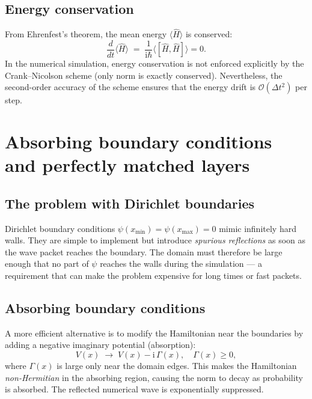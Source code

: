 \documentclass[12pt, a4paper]{article}
\newcommand{\dt}{\Delta t}
\newcommand{\ii}{\mathrm{i}}          %
\newcommand{\CN}{Crank--Nicolson}
\begin{document}
\subsection{Energy conservation}

From Ehrenfest's theorem, the mean energy $\langle\hat{H}\rangle$ is
conserved:
\begin{equation}
  \frac{d}{dt}\langle\hat{H}\rangle \;=\;
  \frac{1}{\ii\hbar}\langle[\hat{H},\hat{H}]\rangle = 0.
\end{equation}
In the numerical simulation, energy conservation is not enforced
explicitly by the \CN{} scheme (only norm is exactly conserved).
Nevertheless, the second-order accuracy of the scheme ensures that
the energy drift is $\mathcal{O}(\dt^2)$ per step.

\section{Absorbing boundary conditions and perfectly matched layers}
\label{app:abc}

\subsection{The problem with Dirichlet boundaries}

Dirichlet boundary conditions $\psi(x_\text{min}) = \psi(x_\text{max}) = 0$
mimic infinitely hard walls.  They are simple to implement but introduce
\emph{spurious reflections} as soon as the wave packet reaches the boundary.
The domain must therefore be large enough that no part of $\psi$ reaches
the walls during the simulation — a requirement that can make the problem
expensive for long times or fast packets.

\subsection{Absorbing boundary conditions}

A more efficient alternative is to modify the Hamiltonian near the
boundaries by adding a negative imaginary potential (absorption):
\begin{equation}
  V(x) \;\to\; V(x) - \ii\,\Gamma(x),
  \quad \Gamma(x) \geq 0,
\end{equation}
where $\Gamma(x)$ is large only near the domain edges.  This makes
the Hamiltonian \emph{non-Hermitian} in the absorbing region, causing
the norm to decay as probability is absorbed.  The reflected numerical
wave is exponentially suppressed.
\end{document}
